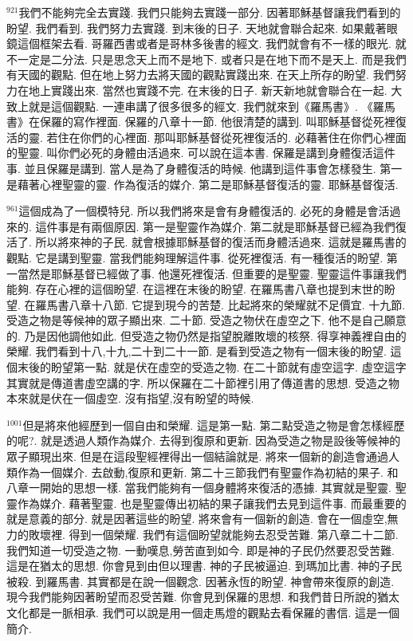 \documentclass{book}
\begin{document}
$^{921}$我們不能夠完全去實踐.
我們只能夠去實踐一部分.
因著耶穌基督讓我們看到的盼望.
我們看到.
我們努力去實踐.
到末後的日子.
天地就會聯合起來.
如果戴著眼鏡這個框架去看.
哥羅西書或者是哥林多後書的經文.
我們就會有不一樣的眼光.
就不一定是二分法.
只是思念天上而不是地下.
或者只是在地下而不是天上.
而是我們有天國的觀點.
但在地上努力去將天國的觀點實踐出來.
在天上所存的盼望.
我們努力在地上實踐出來.
當然也實踐不完.
在末後的日子.
新天新地就會聯合在一起.
大致上就是這個觀點.
一連串講了很多很多的經文.
我們就來到《羅馬書》.
《羅馬書》在保羅的寫作裡面.
保羅的八章十一節.
他很清楚的講到.
叫耶穌基督從死裡復活的靈.
若住在你們的心裡面.
那叫耶穌基督從死裡復活的.
必藉著住在你們心裡面的聖靈.
叫你們必死的身體由活過來.
可以說在這本書.
保羅是講到身體復活這件事.
並且保羅是講到.
當人是為了身體復活的時候.
他講到這件事會怎樣發生.
第一是藉著心裡聖靈的靈.
作為復活的媒介.
第二是耶穌基督復活的靈.
耶穌基督復活.

$^{961}$這個成為了一個模特兒.
所以我們將來是會有身體復活的.
必死的身體是會活過來的.
這件事是有兩個原因.
第一是聖靈作為媒介.
第二就是耶穌基督已經為我們復活了.
所以將來神的子民.
就會根據耶穌基督的復活而身體活過來.
這就是羅馬書的觀點.
它是講到聖靈.
當我們能夠理解這件事.
從死裡復活.
有一種復活的盼望.
第一當然是耶穌基督已經做了事.
他還死裡復活.
但重要的是聖靈.
聖靈這件事讓我們能夠.
存在心裡的這個盼望.
在這裡在末後的盼望.
在羅馬書八章也提到末世的盼望.
在羅馬書八章十八節.
它提到現今的苦楚.
比起將來的榮耀就不足價宜.
十九節.
受造之物是等候神的眾子顯出來.
二十節.
受造之物伏在虛空之下.
他不是自己願意的.
乃是因他調他如此.
但受造之物仍然是指望脫離敗壞的核祭.
得享神義裡自由的榮耀.
我們看到十八,十九,二十到二十一節.
是看到受造之物有一個末後的盼望.
這個末後的盼望第一點.
就是伏在虛空的受造之物.
在二十節就有虛空這字.
虛空這字其實就是傳道書虛空講的字.
所以保羅在二十節裡引用了傳道書的思想.
受造之物本來就是伏在一個虛空.
沒有指望,沒有盼望的時候.

$^{1001}$但是將來他經歷到一個自由和榮耀.
這是第一點.
第二點受造之物是會怎樣經歷的呢?.
就是透過人類作為媒介.
去得到復原和更新.
因為受造之物是設後等候神的眾子顯現出來.
但是在這段聖經裡得出一個結論就是.
將來一個新的創造會通過人類作為一個媒介.
去啟動,復原和更新.
第二十三節我們有聖靈作為初結的果子.
和八章一開始的思想一樣.
當我們能夠有一個身體將來復活的憑據.
其實就是聖靈.
聖靈作為媒介.
藉著聖靈.
也是聖靈傳出初結的果子讓我們去見到這件事.
而最重要的就是意義的部分.
就是因著這些的盼望.
將來會有一個新的創造.
會在一個虛空,無力的敗壞裡.
得到一個榮耀.
我們有這個盼望就能夠去忍受苦難.
第八章二十二節.
我們知道一切受造之物.
一動嘆息,勞苦直到如今.
即是神的子民仍然要忍受苦難.
這是在猶太的思想.
你會見到由但以理書.
神的子民被逼迫.
到瑪加比書.
神的子民被殺.
到羅馬書.
其實都是在說一個觀念.
因著永恆的盼望.
神會帶來復原的創造.
現今我們能夠因著盼望而忍受苦難.
你會見到保羅的思想.
和我們昔日所說的猶太文化都是一脈相承.
我們可以說是用一個走馬燈的觀點去看保羅的書信.
這是一個簡介.
\end{document}
